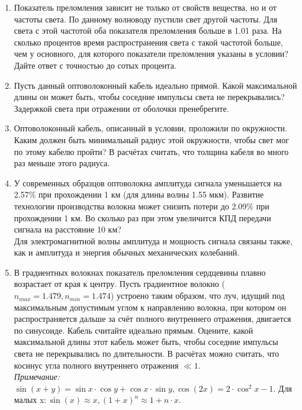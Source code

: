 \begin{enumerate}
\item Показатель преломления зависит не только от свойств вещества, но и от частоты света. По данному волноводу пустили свет другой частоты. Для света с этой частотой оба показателя преломления больше в 1.01 раза. На сколько процентов время распространения света с такой частотой больше, чем у основного, для которого показатели преломления указаны в условии? Дайте ответ с точностью до сотых процента.
\item Пусть данный оптоволоконный кабель идеально прямой. Какой максимальной длины он может быть, чтобы соседние импульсы света не перекрывались? Задержкой света при отражении от оболочки пренебрегите. 
\item Оптоволоконный кабель, описанный в условии, проложили по окружности. Каким должен быть минимальный радиус этой окружности, чтобы свет мог по этому кабелю пройти? В расчётах считать, что толщина кабеля во много раз меньше этого радиуса.
\item У современных образцов оптоволокна амплитуда сигнала уменьшается на  2.57\% при прохождении 1 км (для длины волны 1.55 мкм). Развитие технологии производства волокна может снизить потери до 2.09\% при прохождении 1 км.  Во сколько раз при этом увеличится КПД передачи сигнала на расстояние 10 км?\\
Для электромагнитной волны амплитуда и мощность сигнала связаны также, как и амплитуда и энергия обычных механических колебаний. 
\item В градиентных волокнах показатель преломления сердцевины плавно возрастает от края к центру. Пусть градиентное волокно ($n_{max} = 1.479, n_{min} = 1.474$) устроено таким образом, что луч, идущий под максимальным допустимым углом к направлению волокна, при котором он распространяется дальше за счёт полного внутреннего отражения, двигается по синусоиде.  Кабель считайте идеально прямым. Оцените, какой максимальной длины этот кабель может быть, чтобы соседние импульсы света не перекрывались по длительности. В расчётах можно считать, что косинус угла полного внутреннего отражения $\ll 1$. \\
\textit{Примечание:} $\sin(x+y)=\sin{x}\cdot\cos{y}+\cos{x}\cdot\sin{y}, \cos(2x)=2\cdot\cos^2x-1$.
Для малых x$: \sin(x)\approx x,   (1+x)^n\approx1+n\cdot x$.

\end{enumerate}